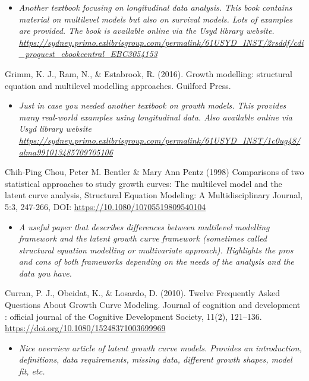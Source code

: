 \documentclass[
]{book}
\providecommand{\tightlist}{%
  \setlength{\itemsep}{0pt}\setlength{\parskip}{0pt}}
\begin{document}
\begin{itemize}
\tightlist
\item
  \emph{Another textbook focusing on longitudinal data analysis. This book contains material on multilevel models but also on survival models. Lots of examples are provided. The book is available online via the Usyd library website. \url{https://sydney.primo.exlibrisgroup.com/permalink/61USYD_INST/2rsddf/cdi_proquest_ebookcentral_EBC3054153}}
\end{itemize}

Grimm, K. J., Ram, N., \& Estabrook, R. (2016). Growth modelling: structural equation and multilevel modelling approaches. Guilford Press.

\begin{itemize}
\tightlist
\item
  \emph{Just in case you needed another textbook on growth models. This provides many real-world examples using longitudinal data. Also available online via Usyd library website \url{https://sydney.primo.exlibrisgroup.com/permalink/61USYD_INST/1c0ug48/alma991013485709705106}}
\end{itemize}

Chih‐Ping Chou, Peter M. Bentler \& Mary Ann Pentz (1998) Comparisons of two statistical approaches to study growth curves: The multilevel model and the latent curve analysis, Structural Equation Modeling: A Multidisciplinary Journal, 5:3, 247-266, DOI: \url{https://10.1080/10705519809540104}

\begin{itemize}
\tightlist
\item
  \emph{A useful paper that describes differences between multilevel modelling framework and the latent growth curve framework (sometimes called structural equation modelling or multivariate approach). Highlights the pros and cons of both frameworks depending on the needs of the analysis and the data you have. }
\end{itemize}

Curran, P. J., Obeidat, K., \& Losardo, D. (2010). Twelve Frequently Asked Questions About Growth Curve Modeling. Journal of cognition and development : official journal of the Cognitive Development Society, 11(2), 121--136. \url{https://doi.org/10.1080/15248371003699969}

\begin{itemize}
\tightlist
\item
  \emph{Nice overview article of latent growth curve models. Provides an introduction, definitions, data requirements, missing data, different growth shapes, model fit, etc. }
\end{itemize}
\end{document}
